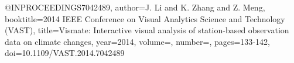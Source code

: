 @INPROCEEDINGS{7042489,
  author={J. {Li} and K. {Zhang} and Z. {Meng}},
  booktitle={2014 IEEE Conference on Visual Analytics Science and Technology (VAST)}, 
  title={Vismate: Interactive visual analysis of station-based observation data on climate changes}, 
  year={2014},
  volume={},
  number={},
  pages={133-142},
  doi={10.1109/VAST.2014.7042489}}
